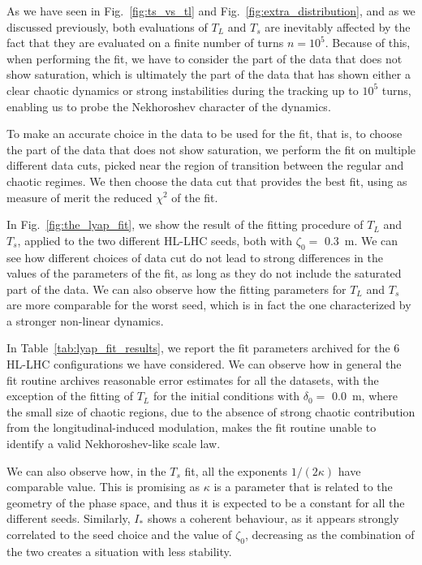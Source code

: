 As we have seen in Fig.~\ref{fig:ts_vs_tl} and Fig.~\ref{fig:extra_distribution}, and as we discussed previously, both evaluations of $T_L$ and $T_s$ are inevitably affected by the fact that they are evaluated on a finite number of turns $n=10^5$. Because of this, when performing the fit, we have to consider the part of the data that does not show saturation, which is ultimately the part of the data that has shown either a clear chaotic dynamics or strong instabilities during the tracking up to $10^5$ turns, enabling us to probe the Nekhoroshev character of the dynamics.

To make an accurate choice in the data to be used for the fit, that is, to choose the part of the data that does not show saturation, we perform the fit on multiple different data cuts, picked near the region of transition between the regular and chaotic regimes. We then choose the data cut that provides the best fit, using as measure of merit the reduced $\chi^2$ of the fit.

In Fig.~\ref{fig:the_lyap_fit}, we show the result of the fitting procedure of $T_L$ and $T_s$, applied to the two different HL-LHC seeds, both with $\zeta_0=$ \SI{0.3}{\meter}. We can see how different choices of data cut do not lead to strong differences in the values of the parameters of the fit, as long as they do not include the saturated part of the data. We can also observe how the fitting parameters for $T_L$ and $T_s$ are more comparable for the worst seed, which is in fact the one characterized by a stronger non-linear dynamics.

In Table~\ref{tab:lyap_fit_results}, we report the fit parameters archived for the 6 HL-LHC configurations we have considered. We can observe how in general the fit routine archives reasonable error estimates for all the datasets, with the exception of the fitting of $T_L$ for the initial conditions with $\delta_0 =$ \SI{0.0}{\metre}, where the small size of chaotic regions, due to the absence of strong chaotic contribution from the longitudinal-induced modulation, makes the fit routine unable to identify a valid Nekhoroshev-like scale law.

We can also observe how, in the $T_s$ fit, all the exponents $1/(2\kappa)$ have comparable value. This is promising as $\kappa$ is a parameter that is related to the geometry of the phase space, and thus it is expected to be a constant for all the different seeds. Similarly, $I_\ast$ shows a coherent behaviour, as it appears strongly correlated to the seed choice and the value of $\zeta_0$, decreasing as the combination of the two creates a situation with less stability.

